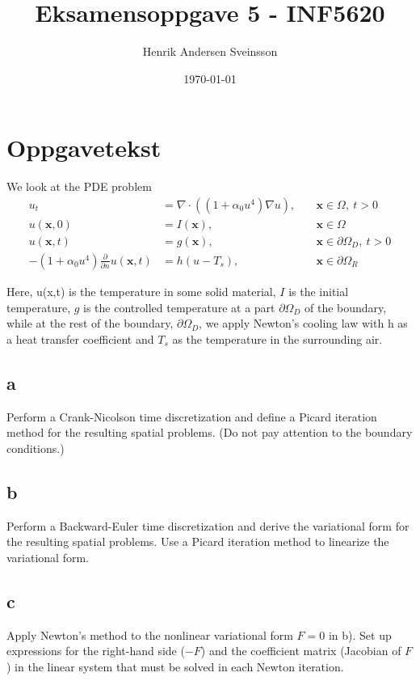 \documentclass[a4paper, 10pt]{article}
\author{Henrik Andersen Sveinsson}
\title{Eksamensoppgave 5 - INF5620}
\date{\today}
\newcommand{\mb}{\mathbf}
\begin{document}
\maketitle

\section{Oppgavetekst}
We look at the PDE problem 
\begin{align*}
u_t &= \nabla\cdot ((1+\alpha_0u^4)\nabla u),\quad & \mb{x} \in\Omega,\
t >0\\
u(\mb{x},0) &= I(\mb{x}),\quad &\mb{x}\in\Omega\\
u(\mb{x},t) &= g(\mb{x}),\quad &\mb{x}\in\partial\Omega_D,\ t>0\\
-(1+\alpha_0u^4)\frac{\partial}{\partial n} u(\mb{x}, t) &= h(u - T_s),\quad
&\mb{x}\in\partial\Omega_R
\end{align*}

Here, u(x,t) is the temperature in some solid material, $I$ is the initial temperature, $g$ is the controlled temperature at a part $\partial \Omega_D$ of the boundary, while at the rest of the boundary, $\partial \Omega_D$, we apply Newton's cooling law with h as a heat transfer coefficient and $T_s$ as the temperature in the surrounding air.

\subsection{a}
Perform a Crank-Nicolson time discretization and define a Picard iteration method for the resulting spatial problems. (Do not pay attention to the boundary conditions.)

\subsection{b} Perform a Backward-Euler time discretization and derive the variational form for the resulting spatial problems. Use a Picard iteration method to linearize the variational form.

\subsection{c} Apply Newton's method to the nonlinear variational form $F=0$ in b). Set up expressions for the right-hand side ($−F$) and the coefficient matrix (Jacobian of $F$) in the linear system that must be solved in each Newton iteration.
\end{document}
